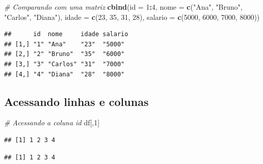 \documentclass[
]{book}
\newenvironment{Shaded}{\begin{snugshade}}{\end{snugshade}}
\newcommand{\AttributeTok}[1]{\textcolor[rgb]{0.13,0.29,0.53}{#1}}
\newcommand{\CommentTok}[1]{\textcolor[rgb]{0.56,0.35,0.01}{\textit{#1}}}
\newcommand{\DecValTok}[1]{\textcolor[rgb]{0.00,0.00,0.81}{#1}}
\newcommand{\FunctionTok}[1]{\textcolor[rgb]{0.13,0.29,0.53}{\textbf{#1}}}
\newcommand{\NormalTok}[1]{#1}
\newcommand{\SpecialCharTok}[1]{\textcolor[rgb]{0.81,0.36,0.00}{\textbf{#1}}}
\newcommand{\StringTok}[1]{\textcolor[rgb]{0.31,0.60,0.02}{#1}}
\begin{document}
\begin{Shaded}
\begin{Highlighting}[]
\CommentTok{\# Comparando com uma matriz}
\FunctionTok{cbind}\NormalTok{(}\AttributeTok{id =} \DecValTok{1}\SpecialCharTok{:}\DecValTok{4}\NormalTok{,}
\AttributeTok{nome =} \FunctionTok{c}\NormalTok{(}\StringTok{"Ana"}\NormalTok{, }\StringTok{"Bruno"}\NormalTok{, }\StringTok{"Carlos"}\NormalTok{, }\StringTok{"Diana"}\NormalTok{),}
\AttributeTok{idade =} \FunctionTok{c}\NormalTok{(}\DecValTok{23}\NormalTok{, }\DecValTok{35}\NormalTok{, }\DecValTok{31}\NormalTok{, }\DecValTok{28}\NormalTok{),}
\AttributeTok{salario =} \FunctionTok{c}\NormalTok{(}\DecValTok{5000}\NormalTok{, }\DecValTok{6000}\NormalTok{, }\DecValTok{7000}\NormalTok{, }\DecValTok{8000}\NormalTok{))}
\end{Highlighting}
\end{Shaded}

\begin{verbatim}
##      id  nome     idade salario
## [1,] "1" "Ana"    "23"  "5000" 
## [2,] "2" "Bruno"  "35"  "6000" 
## [3,] "3" "Carlos" "31"  "7000" 
## [4,] "4" "Diana"  "28"  "8000"
\end{verbatim}

\subsection{Acessando linhas e colunas}\label{acessando-linhas-e-colunas}

\begin{Shaded}
\begin{Highlighting}[]
\CommentTok{\# Acessando a coluna id}
\NormalTok{df[,}\DecValTok{1}\NormalTok{]}
\end{Highlighting}
\end{Shaded}

\begin{verbatim}
## [1] 1 2 3 4
\end{verbatim}

\begin{Shaded}
\end{Shaded}

\begin{verbatim}
## [1] 1 2 3 4
\end{verbatim}
\end{document}
